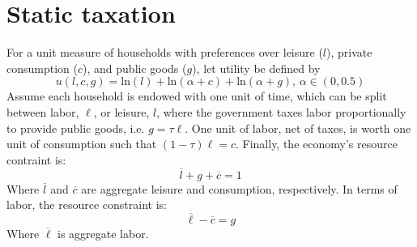 \documentclass{article}
\newcommand{\loge}[1]{\text{ln}\left(#1\right)}
\begin{document}
\pagebreak
\section{Static taxation}
For a unit measure of households with preferences over leisure ($l$), private consumption ($c$), and public goods ($g$), let utility be defined by
\[
	u(l,c,g) = \loge{l} + \loge{\alpha + c} + \loge{\alpha + g}\text{, }\alpha\in(0,0.5) 
\]
Assume each household is endowed with one unit of time, which can be split between labor, $\ell$, or leisure, $l$, where the government taxes labor proportionally to provide public goods, i.e. $g=\tau\ell$. One unit of labor, net of taxes, is worth one unit of consumption such that $(1-\tau)\ell = c$. Finally, the economy's resource contraint is:
\[
	\overline{l} + g + \overline{c} = 1
\]
Where $\overline{l}$ and $\overline{c}$ are aggregate leisure and consumption, respectively. In terms of labor, the resource constraint is:
\[
	\overline{\ell} - \overline{c} = g
\]
Where $\overline{\ell}$ is aggregate labor.
\end{document}
